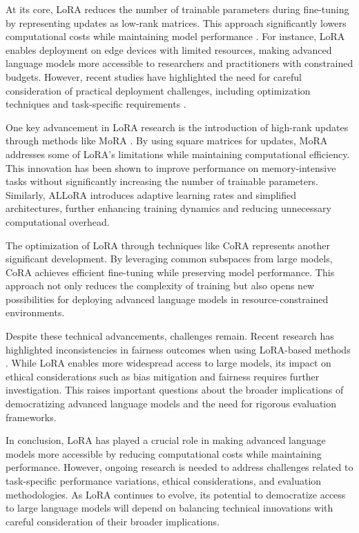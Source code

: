 \documentclass[conference]{IEEEtran}
\begin{document}
At its core, LoRA reduces the number of trainable parameters during fine-tuning by representing updates as low-rank matrices. This approach significantly lowers computational costs while maintaining model performance \cite{b1}. For instance, LoRA enables deployment on edge devices with limited resources, making advanced language models more accessible to researchers and practitioners with constrained budgets. However, recent studies have highlighted the need for careful consideration of practical deployment challenges, including optimization techniques and task-specific requirements \cite{b2}.

One key advancement in LoRA research is the introduction of high-rank updates through methods like MoRA \cite{b3}. By using square matrices for updates, MoRA addresses some of LoRA's limitations while maintaining computational efficiency. This innovation has been shown to improve performance on memory-intensive tasks without significantly increasing the number of trainable parameters. Similarly, ALLoRA \cite{b4} introduces adaptive learning rates and simplified architectures, further enhancing training dynamics and reducing unnecessary computational overhead.

The optimization of LoRA through techniques like CoRA \cite{b5} represents another significant development. By leveraging common subspaces from large models, CoRA achieves efficient fine-tuning while preserving model performance. This approach not only reduces the complexity of training but also opens new possibilities for deploying advanced language models in resource-constrained environments.

Despite these technical advancements, challenges remain. Recent research has highlighted inconsistencies in fairness outcomes when using LoRA-based methods \cite{b6}. While LoRA enables more widespread access to large models, its impact on ethical considerations such as bias mitigation and fairness requires further investigation. This raises important questions about the broader implications of democratizing advanced language models and the need for rigorous evaluation frameworks.

In conclusion, LoRA has played a crucial role in making advanced language models more accessible by reducing computational costs while maintaining performance. However, ongoing research is needed to address challenges related to task-specific performance variations, ethical considerations, and evaluation methodologies. As LoRA continues to evolve, its potential to democratize access to large language models will depend on balancing technical innovations with careful consideration of their broader implications.
\end{document}
